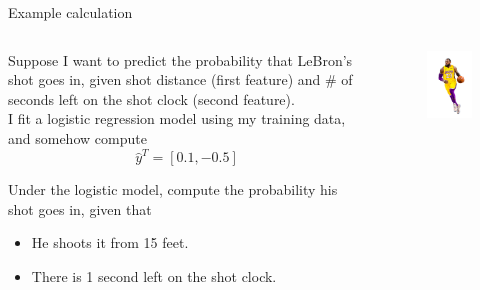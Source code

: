 \documentclass[aspectratio=169]{../latex_main/tntbeamer}  %
\begin{document}
	
	\begin{frame}{Example calculation}
	   
	   \begin{columns}
	    
	   \begin{column}{.5\textwidth}
	    Suppose I want to predict the probability that LeBron’s shot goes in, given shot distance (first feature) and # of seconds left on the shot clock (second feature).\\
	    \bigskip
	    I fit a logistic regression model using my training data, and somehow compute
	    \begin{equation*}
	        \hat{y}^T = [0.1 , -0.5]
	    \end{equation*}
	    
	   Under the logistic model, compute the probability his shot goes in, given that
	    \begin{itemize}
	        \item He shoots it from 15 feet.
	        \item There is 1 second left on the shot clock.
	    \end{itemize}
	    \end{column}
	    \begin{column}{.5\textwidth}
	        \begin{figure}
	            \centering
	            \includegraphics[scale=.9]{Bild7}
	        \end{figure}
	    \end{column}
	    
	    \end{columns}
	\end{frame}
	
\end{document}
